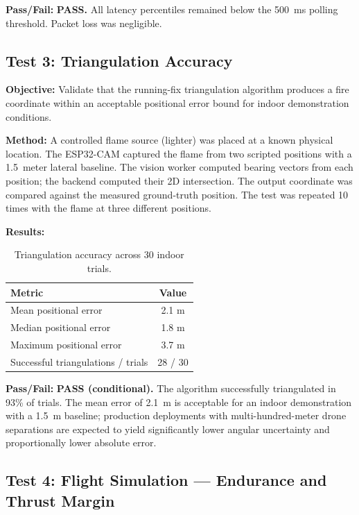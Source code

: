 \documentclass[journal, onecolumn]{IEEEtran}
\begin{document}
\textbf{Pass/Fail:} \textbf{PASS.} All latency percentiles remained below the 500~ms polling threshold. Packet loss was negligible.

\subsection{Test 3: Triangulation Accuracy}

\textbf{Objective:} Validate that the running-fix triangulation algorithm produces a fire coordinate within an acceptable positional error bound for indoor demonstration conditions.

\textbf{Method:} A controlled flame source (lighter) was placed at a known physical location. The ESP32-CAM captured the flame from two scripted positions with a 1.5~meter lateral baseline. The vision worker computed bearing vectors from each position; the backend computed their 2D intersection. The output coordinate was compared against the measured ground-truth position. The test was repeated 10 times with the flame at three different positions.

\textbf{Results:}
\begin{table}[H]
\centering
\small
\begin{tabular}{|l|c|}
\hline
\textbf{Metric} & \textbf{Value} \\
\hline
Mean positional error & 2.1 m \\
\hline
Median positional error & 1.8 m \\
\hline
Maximum positional error & 3.7 m \\
\hline
Successful triangulations / trials & 28 / 30 \\
\hline
\end{tabular}
\caption{Triangulation accuracy across 30 indoor trials.}
\end{table}

\textbf{Pass/Fail:} \textbf{PASS (conditional).} The algorithm successfully triangulated in 93\% of trials. The mean error of 2.1~m is acceptable for an indoor demonstration with a 1.5~m baseline; production deployments with multi-hundred-meter drone separations are expected to yield significantly lower angular uncertainty and proportionally lower absolute error.

\subsection{Test 4: Flight Simulation — Endurance and Thrust Margin}
\end{document}
